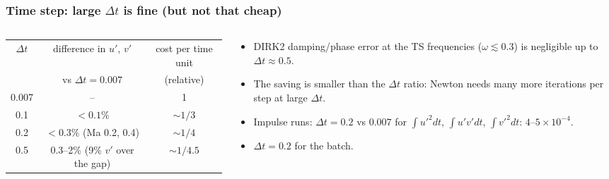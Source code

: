 \documentclass[
  aspectratio=169,
  t,
  onlytextwidth,
  10pt,
]{beamer}
\begin{document}
\begin{frame}
	\frametitle{Time step: large $\Delta t$ is fine (but not that cheap)}
	\small
	\begin{columns}[T]
		\begin{column}{0.52\linewidth}
			\centering\footnotesize
			\renewcommand{\arraystretch}{1.15}
			\begin{tabular}{ccc}
				\toprule
				$\Delta t$ & difference in $u'$, $v'$ & cost per time unit \\
				           & vs $\Delta t=0.007$       & (relative) \\
				\midrule
				0.007 & --                    & 1 \\
				0.1   & $<0.1\%$              & $\sim1/3$ \\
				0.2   & $<0.3\%$ (Ma 0.2, 0.4) & $\sim1/4$ \\
				0.5   & 0.3--2\% (9\% $v'$ over the gap) & $\sim1/4.5$ \\
				\bottomrule
			\end{tabular}
		\end{column}
		\begin{column}{0.46\linewidth}
			\begin{itemize}\footnotesize
				\item DIRK2 damping/phase error at the TS frequencies ($\omega\lesssim0.3$) is negligible up to $\Delta t\approx0.5$.
				\item The saving is smaller than the $\Delta t$ ratio: Newton needs many more iterations per step at large $\Delta t$.
				\item Impulse runs: $\Delta t=0.2$ vs $0.007$ for $\int u'^2dt$, $\int u'v'dt$, $\int v'^2dt$: $4$--$5\times10^{-4}$.
				\item \textbf{$\Delta t = 0.2$} for the batch.
			\end{itemize}
		\end{column}
	\end{columns}
\end{frame}
\end{document}
